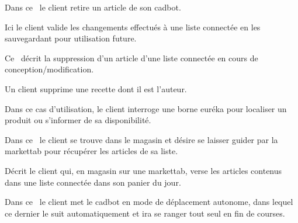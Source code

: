 Dans ce \cu\ le client retire un article de son cadbot.

Ici le client valide les changements effectués à une liste connectée en les sauvegardant pour utilisation future.

Ce \cu\ décrit la suppression d'un article d'une liste connectée en cours de conception/modification.

Un client supprime une recette dont il est l'auteur.

Dans ce cas d'utilisation, le client interroge une borne euréka pour localiser un produit ou s'informer de sa disponibilité.

Dans ce \cu\ le client se trouve dans le magasin et désire se laisser guider par la markettab pour récupérer les articles de sa liste.

Décrit le client qui, en magasin sur une markettab, verse les articles contenus dans une liste connectée dans son panier du jour.

Dans ce \cu\ le client met le cadbot en mode de déplacement autonome, dans lequel ce dernier le suit automatiquement et ira se ranger tout seul en fin de courses.
\par

